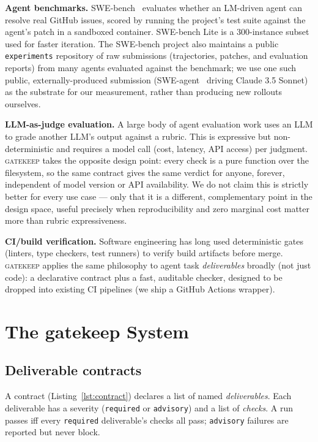 \documentclass{article}
\begin{document}
\textbf{Agent benchmarks.} SWE-bench~\citep{jimenez2024swebench} evaluates
whether an LM-driven agent can resolve real GitHub issues, scored by
running the project's test suite against the agent's patch in a sandboxed
container. SWE-bench Lite is a 300-instance subset used for faster
iteration. The SWE-bench project also maintains a public
\texttt{experiments} repository of raw submissions (trajectories, patches,
and evaluation reports) from many agents evaluated against the benchmark;
we use one such public, externally-produced submission
(SWE-agent~\citep{yang2024sweagent} driving Claude 3.5 Sonnet) as the
substrate for our measurement, rather than producing new rollouts
ourselves.

\textbf{LLM-as-judge evaluation.} A large body of agent evaluation work
uses an LLM to grade another LLM's output against a rubric. This is
expressive but non-deterministic and requires a model call (cost, latency,
API access) per judgment. \textsc{gatekeep} takes the opposite design
point: every check is a pure function over the filesystem, so the same
contract gives the same verdict for anyone, forever, independent of model
version or API availability. We do not claim this is strictly better for
every use case --- only that it is a different, complementary point in the
design space, useful precisely when reproducibility and zero marginal cost
matter more than rubric expressiveness.

\textbf{CI/build verification.} Software engineering has long used
deterministic gates (linters, type checkers, test runners) to verify build
artifacts before merge. \textsc{gatekeep} applies the same philosophy to
agent task \emph{deliverables} broadly (not just code): a declarative
contract plus a fast, auditable checker, designed to be dropped into
existing CI pipelines (we ship a GitHub Actions wrapper).

\section{The gatekeep System}

\subsection{Deliverable contracts}

A contract (Listing~\ref{lst:contract}) declares a list of named
\emph{deliverables}. Each deliverable has a severity (\texttt{required} or
\texttt{advisory}) and a list of \emph{checks}. A run passes iff every
\texttt{required} deliverable's checks all pass; \texttt{advisory}
failures are reported but never block.
\end{document}
